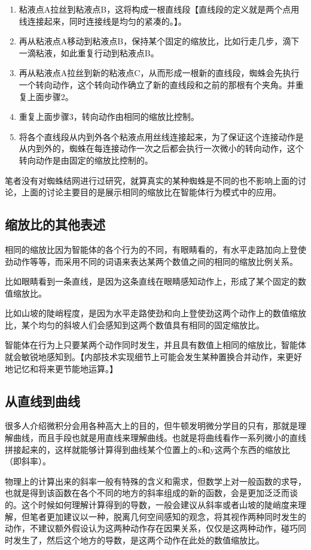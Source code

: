 \documentclass[12pt,oneside]{book}
\begin{document}
\begin{enumerate}
\item 粘液点A拉丝到粘液点B，这将构成一根直线段【直线段的定义就是两个点用线连接起来，同时连接线是均匀的紧凑的。】。
\item 再从粘液点A移动到粘液点B，保持某个固定的缩放比，比如行走几步，滴下一滴粘液，如此重复行动到粘液点B。
\item 再从粘液点A拉丝到新的粘液点C，从而形成一根新的直线段，蜘蛛会先执行一个转向动作，这个转向动作确立了新的直线段和之前的那根有个夹角。并重复上面步骤2。
\item 重复上面步骤3，转向动作由相同的缩放比控制。
\item 将各个直线段从内到外各个粘液点用丝线连接起来，为了保证这个连接动作是从内到外的，蜘蛛在每连接动作一次之后都会执行一次微小的转向动作，这个转向动作是由固定的缩放比控制的。
\end{enumerate}

笔者没有对蜘蛛结网进行过研究，就算真实的某种蜘蛛是不同的也不影响上面的讨论，上面的讨论主要目的是展示相同的缩放比在智能体行为模式中的应用。



\subsection{缩放比的其他表述}
相同的缩放比因为智能体的各个行为的不同，有眼睛看的，有水平走路加向上登使劲动作等等，而采用不同的词语来表达某两个数值之间的相同的缩放比例关系。

比如眼睛看到一条直线，是因为这条直线在眼睛感知动作上，形成了某个固定的数值缩放比。

比如山坡的陡峭程度，是因为水平走路使劲和向上登使劲这两个动作上的数值缩放比，某个均匀的斜坡人们会感知到这两个数值具有相同的固定缩放比。

智能体在行为上只要某两个动作同时发生，并且具有数值上相同的缩放比，智能体就会敏锐地感知到。【内部技术实现细节上可能会发生某种置换合并动作，来更好地记忆和将来更节能地运算。】


\subsection{从直线到曲线}
很多人介绍微积分会用各种高大上的目的，但牛顿发明微分学目的只有，那就是理解曲线，而且手段也就是用直线来理解曲线。也就是将曲线看作一系列微小的直线拼接起来的，这样就能够计算得到曲线某个位置上的x和y这两个东西的缩放比（即斜率）。

物理上的计算出来的斜率一般有特殊的含义和需求，但数学上对一般函数的求导，也就是得到该函数在各个不同的地方的斜率组成的新的函数，会是更加泛泛而谈的。这个时候如何理解计算得到的导数，一般会建议从斜率或者山坡的陡峭度来理解，但笔者更加建议以一种，脱离几何空间感知的观念，将其视作两种同时发生的动作，不建议额外假设认为这两种动作存在因果关系，仅仅是这两种动作，碰巧同时发生了，然后这个地方的导数，是这两个动作在此处的数值缩放比。
\end{document}
